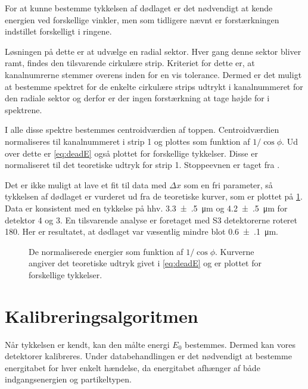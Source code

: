For at kunne bestemme tykkelsen af dødlaget er det nødvendigt at kende energien ved forskellige
vinkler, men som tidligere nævnt er forstærkningen indstillet forskelligt i ringene.

Løsningen på dette er at udvælge en radial sektor. Hver gang denne sektor bliver ramt, findes den
tilsvarende cirkulære strip. Kriteriet for dette er, at kanalnumrerne stemmer overens inden for en
vis tolerance. Dermed er det muligt at bestemme spektret for de enkelte cirkulære strips udtrykt i
kanalnummeret for den radiale sektor og derfor er der ingen forstærkning at tage højde for i
spektrene.

I alle disse spektre bestemmes centroidværdien af \Pu toppen.  Centroidværdien normaliseres til
kanalnummeret i strip 1 og plottes som funktion af $1/{\cos \phi}$. Ud over dette er
\cref{eq:deadE} også plottet for forskellige tykkelser. Disse er normaliseret til det teoretiske
udtryk for strip 1. Stoppeevnen er taget fra \cite{Ziegler}.

Det er ikke muligt at lave et fit til data med $\Delta x$ som en fri parameter, så tykkelsen af
dødlaget er vurderet ud fra de teoretiske kurver, som er plottet på \cref{fig:dead}. Data er
konsistent med en tykkelse på hhv. \SI{3.3(5)}{\um} og \SI{4.2(5)}{\um} for detektor 4 og 3. En
tilsvarende analyse er foretaget med S3 detektorerne roteret 180\degree. Her er resultatet, at
dødlaget var væsentlig mindre blot \SI{0.6(1)}{\um}. 

\begin{figure}[h]
  \centering
  \hfill
  \caption{De normaliserede energier som funktion af $1/{\cos\phi}$. Kurverne angiver det teoretiske
    udtryk givet i \cref{eq:deadE} og er plottet for forskellige tykkelser.}
  \label{fig:dead}
\end{figure}

\vspace{-5mm}
\section{Kalibreringsalgoritmen}
\label{sec:kalalgo}

Når tykkelsen er kendt, kan den målte energi $E_{0}$ bestemmes. Dermed kan vores detektorer
kalibreres. Under databehandlingen er det nødvendigt at bestemme energitabet for hver enkelt
hændelse, da energitabet afhænger af både indgangsenergien og partikeltypen.

